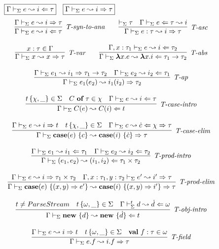 \begin{figure}
\vspace{-10px}
$\fbox{$\Gamma \vdash_\Sigma e \leadsto i \Leftarrow \tau$}$~
$\fbox{$\Gamma \vdash_\Sigma e \leadsto i \Rightarrow \tau$}$
\[
\begin{array}{c}
\infer[\textit{T-syn-to-ana}]
	{\Gamma \vdash_\Sigma  e \leadsto i\Leftarrow \tau } 
	{\Gamma \vdash_\Sigma e  \leadsto i\Rightarrow \tau  }
~~~~~~
\infer[\textit{T-asc}]
	{\Gamma  \vdash_\Sigma e:\tau \leadsto i \Rightarrow \tau}
	{\vdash_\Sigma \tau & \Gamma \vdash_\Sigma e \Leftarrow \tau \leadsto i } \\[3ex]

\infer[\textit{T-var}]
	{\Gamma \vdash_\Sigma x \leadsto x \Rightarrow\tau } 
	{x:\tau \in \Gamma }
~~~~~~
\infer[\textit{T-abs}]
	{\Gamma \vdash_\Sigma  \boldsymbol\lambda x . e \leadsto \boldsymbol\lambda x .i \Leftarrow \tau_1 \rightarrow \tau_2 } 
	{\Gamma, x:\tau_1 \vdash_\Sigma e\leadsto i\Leftarrow \tau_2 }\\[3ex]

\infer[\textit{T-ap}]
	{\Gamma \vdash_\Sigma  e_1(e_2) \leadsto i_1(i_2) \Rightarrow \tau_2  } 
	{\Gamma \vdash_\Sigma e_1 \leadsto i_1 \Rightarrow \tau_1 \rightarrow \tau_2    & \Gamma \vdash_\Sigma e_2  \leadsto i_2 \Leftarrow \tau_1}\\[3ex]

\infer[\textit{T-case-intro}]
	{\Gamma \vdash_\Sigma  C(e) \leadsto C(i) \Leftarrow t} 
	{t\,\{\chi, \_\} \in \Sigma & C\ \keyw{of}\ \tau \in \chi &\Gamma \vdash_\Sigma e \leadsto i \Leftarrow \tau }\\[3ex]

\infer[\textit{T-case-elim}]
	{\Gamma \vdash_\Sigma  \keyw{case}(e)~\{ c \}   \leadsto \keyw{case}(i)~\{ \dot{c} \} \Rightarrow \tau} 
	{\Gamma \vdash_\Sigma e   \leadsto i \Rightarrow t & t\,\{ \chi,\_\} \in \Sigma & \Gamma \vdash_\Sigma c \leadsto \dot{c} \Leftarrow \chi \Rightarrow \tau}\\[3ex]
	
\infer[\textit{T-prod-intro}]
	{\Gamma \vdash_\Sigma (e_1, e_2)  \leadsto (i_1, i_2) \Leftarrow \tau_1 \times \tau_2}
	{\Gamma \vdash_\Sigma e_1 \leadsto i_1 \Leftarrow \tau_1 & 
	 \Gamma \vdash_\Sigma e_2  \leadsto i_2 \Leftarrow \tau_2}
	 \\[3ex]
\infer[\textit{T-prod-elim}]
	{\Gamma \vdash_\Sigma \keyw{case}(e)~\{ (x, y) \Rightarrow e' \} \leadsto \keyw{case}(i)~\{ (x, y) \Rightarrow i' \} \Rightarrow \tau}
	{\Gamma \vdash_\Sigma e \leadsto i \Rightarrow \tau_1 \times \tau_2& 
	 \Gamma, x : \tau_1, y : \tau_2 \vdash_\Sigma e' \leadsto i' \Rightarrow \tau}
	\\[3ex]
\infer[\textit{T-obj-intro}]
	{\Gamma \vdash_\Sigma \keyw{new}\ \{ d \}  \leadsto \keyw{new}\ \{\dot d\} \Leftarrow  t}
	{ t\neq ParseStream & t\,\{\omega, \_\} \in \Sigma & \Gamma \vdash_\Sigma^t d \leadsto \dot d \Leftarrow \omega} \\[3ex]
\infer[\textit{T-field}]
	{\Gamma \vdash_\Sigma  e.f \leadsto i.f \Rightarrow \tau} 
	{\Gamma \vdash_\Sigma e \leadsto i \Rightarrow t & t\,\{\omega, \_\}\in \Sigma & \keyw{val}\ f:\tau \in \omega  }\\[3ex]


\end{array}\]
\end{figure}
